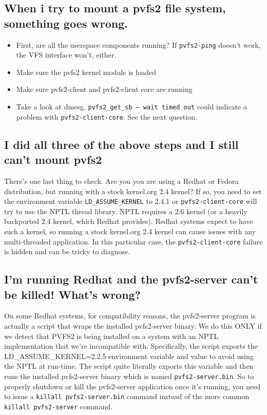\documentclass[11pt,letterpaper]{article}
\begin{document}
\subsection{When i try to mount a pvfs2 file system, something goes wrong.}

\begin{itemize}
\item First, are all the userspace components running?  If \texttt{pvfs2-ping}
doesn't work, the VFS interface won't, either.
\item Make sure the pvfs2 kernel module is loaded
\item Make sure pvfs2-client and pvfs2-client core are running
\item Take a look at dmesg.  \texttt{pvfs2\_get\_sb -- wait timed out} could
      indicate a problem with \texttt{pvfs2-client-core}.  See the next
      question.
\end{itemize}

\subsection{I did all three of the above steps and I still can't mount pvfs2}
\label{sec:nptl_and_mounting}

There's one last thing to check.  Are you you are using a Redhat or Fedora
distribution, but running with a stock kernel.org 2.4 kernel?  If so, you need
to set the environment variable \texttt{LD\_ASSUME\_KERNEL} to 2.4.1 or
\texttt{pvfs2-client-core} will try to use the NPTL thread library.  NPTL
requires a 2.6 kernel (or a heavily backported 2.4 kernel, which Redhat
provides).  Redhat systems expect to have such a kernel, so running a stock
kernel.org 2.4 kernel can cause issues with any multi-threaded application.  In
this particular case, the \texttt{pvfs2-client-core} failure is hidden and can
be tricky to diagnose. 

\subsection{I'm running Redhat and the pvfs2-server can't be killed! What's wrong?}

On some Redhat systems, for compatibility reasons, the pvfs2-server
program is actually a script that wraps the installed pvfs2-server
binary.  We do this ONLY if we detect that PVFS2 is being installed on
a system with an NPTL implementation that we're incompatible with.
Specifically, the script exports the LD\_ASSUME\_KERNEL=2.2.5
environment variable and value to avoid using the NPTL at run-time.
The script quite literally exports this variable and then runs the
installed pvfs2-server binary which is named
\texttt{pvfs2-server.bin}.  So to properly shutdown or kill the
pvfs2-server application once it's running, you need to issue a
\texttt{killall pvfs2-server.bin} command instead of the more common
\texttt{killall pvfs2-server} command.
\end{document}
